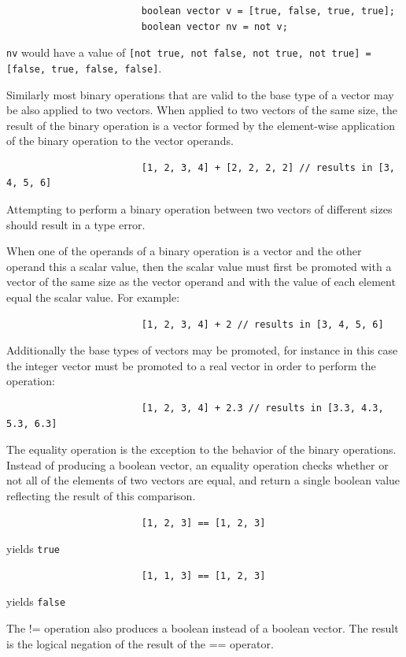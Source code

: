 \documentclass{article}
\begin{document}
\begin{enumerate}
					\begin{lstlisting}
						boolean vector v = [true, false, true, true];
						boolean vector nv = not v;
					\end{lstlisting}

					\texttt{nv} would have a value of \texttt{[not true, not false, not true, not true] = [false, true,
					false, false]}.

					Similarly most binary operations that are valid to the base type of a vector may be also applied to
					two vectors. When applied to two vectors of the same size, the result of the binary operation is a
					vector formed by the element-wise application of the binary operation to the vector operands.

					\begin{lstlisting}
						[1, 2, 3, 4] + [2, 2, 2, 2] // results in [3, 4, 5, 6]
					\end{lstlisting}

					Attempting to perform a binary operation between two vectors of different sizes should result in a
					type error.

					When one of the operands of a binary operation is a vector and the other operand this a scalar
					value, then the scalar value must first be promoted with a vector of the same size as the vector
					operand and with the value of each element equal the scalar value. For example:

					\begin{lstlisting}
						[1, 2, 3, 4] + 2 // results in [3, 4, 5, 6]
					\end{lstlisting}

					Additionally the base types of vectors may be promoted, for instance in this case the integer vector
					must be promoted to a real vector in order to perform the operation:

					\begin{lstlisting}
						[1, 2, 3, 4] + 2.3 // results in [3.3, 4.3, 5.3, 6.3]
					\end{lstlisting}

					The equality operation is the exception to the behavior of the binary operations. Instead of
					producing a boolean vector, an equality operation checks whether or not all of the elements of two
					vectors are equal, and return a single boolean value reflecting the result of this comparison.

					\begin{lstlisting}
						[1, 2, 3] == [1, 2, 3]
					\end{lstlisting}

					yields \texttt{true}

					\begin{lstlisting}
						[1, 1, 3] == [1, 2, 3]
					\end{lstlisting}

					yields \texttt{false}

					The != operation also produces a boolean instead of a boolean vector. The result is the logical
					negation of the result of the == operator.
			\end{enumerate}
\end{document}
